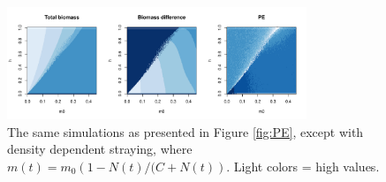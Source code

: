 \documentclass[twocolumn,preprintnumbers,amsmath,amssymb,superscriptaddress]{revtex4}
\begin{document}
\begin{figure}[h!]
\centering
\includegraphics[width=0.8\textwidth]{figs/fig_MDPE_hm_ddm.pdf}
\caption{
The same simulations as presented in Figure \ref{fig:PE}, except with density dependent straying, where $m(t) = m_0\left(1-N(t)/(C+N(t)\right)$. Light colors = high values.
} \label{fig:ddm}
\end{figure}
\end{document}
